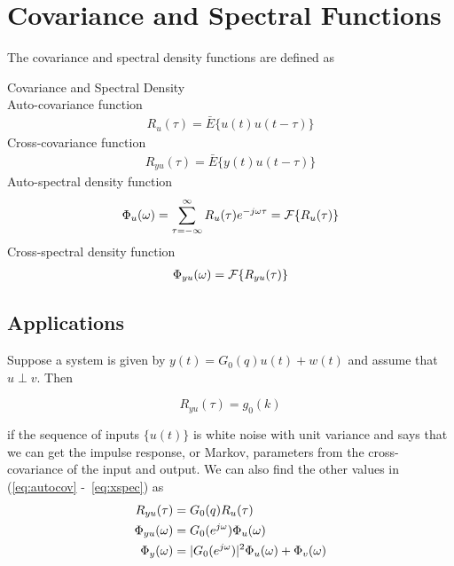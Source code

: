 \mainmatter%
\setcounter{page}{1}

\lectureseries[\course]{\course}

\date{October 8, 2009}

\setaddress%

\setcounter{lecture}{4}
\setcounter{chapter}{4}


\section{Covariance and Spectral Functions}
The covariance and spectral density functions are defined as
\begin{definition}{Covariance and Spectral Density} \\
Auto-covariance function
\begin{align}
\label{eq:autocov}
R_u(\tau) = \bar{E}\{u(t)u(t-\tau)\}
\end{align}
Cross-covariance function
\begin{align}
\label{eq:xcov}
R_{yu}(\tau) = \bar{E}\{y(t)u(t-\tau)\}
\end{align}
Auto-spectral density function
\begin{align}
\label{eq:autospec}
\Phi_u(\omega) = \sum_{\tau=-\infty}^\infty R_u(\tau)e^{-j\omega\tau} = \mathcal{F}\{R_u(\tau)\}
\end{align}
Cross-spectral density function
\begin{align}
\label{eq:xspec}
\Phi_{yu}(\omega) = \mathcal{F}\{R_{yu}(\tau)\}
\end{align}
\end{definition}

\subsection{Applications}
Suppose a system is given by $y(t) = G_0(q)u(t)+w(t)$ and assume that $u\perp v$.
Then

\begin{equation*}
R_{yu}(\tau) = g_0(k)
\end{equation*}

if the sequence of inputs $\{u(t)\}$ is white noise with unit variance and says that we can get the impulse response, or Markov, parameters from the cross-covariance of the input and output.
We can also find the other values in (\ref{eq:autocov} -~\ref{eq:xspec}) as
\begin{align*}
R_{yu}(\tau) &= G_0(q)R_u(\tau) \\
\Phi_{yu}(\omega) &= G_0(e^{j\omega})\Phi_u(\omega) \\
\Phi_y(\omega) &= |G_0(e^{j\omega})|^2\Phi_u(\omega) + \Phi_v(\omega)
\end{align*}

